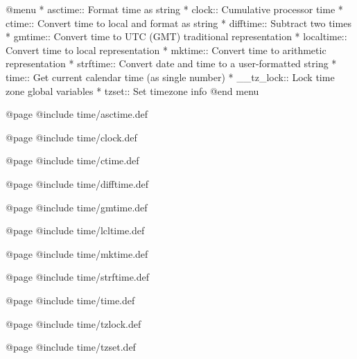 @menu
* asctime::     Format time as string
* clock::       Cumulative processor time
* ctime::       Convert time to local and format as string
* difftime::    Subtract two times
* gmtime::      Convert time to UTC (GMT) traditional representation
* localtime::   Convert time to local representation
* mktime::      Convert time to arithmetic representation
* strftime::    Convert date and time to a user-formatted string
* time::        Get current calendar time (as single number)
* __tz_lock::   Lock time zone global variables
* tzset::       Set timezone info
@end menu

@page
@include time/asctime.def

@page
@include time/clock.def

@page
@include time/ctime.def

@page
@include time/difftime.def

@page
@include time/gmtime.def

@page
@include time/lcltime.def

@page
@include time/mktime.def

@page
@include time/strftime.def

@page
@include time/time.def

@page
@include time/tzlock.def

@page
@include time/tzset.def

